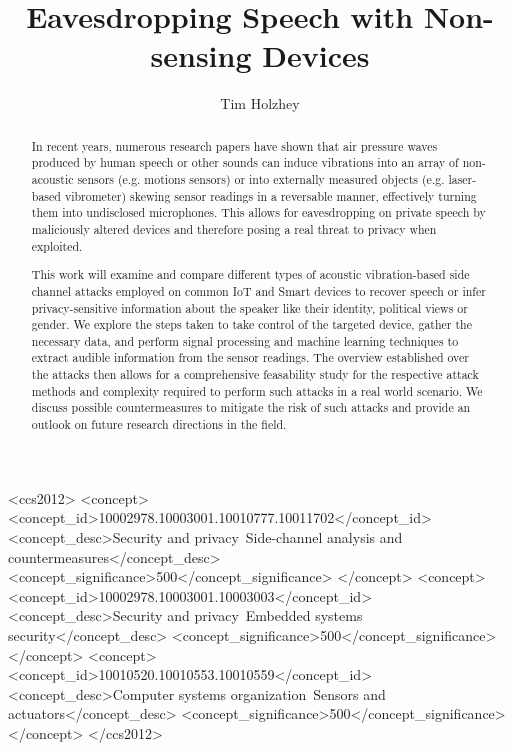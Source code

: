 \documentclass[sigconf, nonacm]{acmart}
\begin{document}
\title{Eavesdropping Speech with Non-sensing Devices}

\author{Tim Holzhey}

\begin{abstract}
  In recent years, numerous research papers have shown that air pressure waves produced by human speech or other sounds can induce vibrations into an array of non-acoustic sensors (e.g. motions sensors) or into externally measured objects (e.g. laser-based vibrometer) skewing sensor readings in a reversable manner, effectively turning them into undisclosed microphones.
  This allows for eavesdropping on private speech by maliciously altered devices and therefore posing a real threat to privacy when exploited.
  
  This work will examine and compare different types of acoustic vibration-based side channel attacks employed on common IoT and Smart devices to recover speech or infer privacy-sensitive information about the speaker like their identity, political views or gender.
  We explore the steps taken to take control of the targeted device, gather the necessary data, and perform signal processing and machine learning techniques to extract audible information from the sensor readings.
  The overview established over the attacks then allows for a comprehensive feasability study for the respective attack methods and complexity required to perform such attacks in a real world scenario. 
  We discuss possible countermeasures to mitigate the risk of such attacks and provide an outlook on future research directions in the field.
\end{abstract}

\begin{CCSXML}
  <ccs2012>
  <concept>
  <concept_id>10002978.10003001.10010777.10011702</concept_id>
  <concept_desc>Security and privacy~Side-channel analysis and countermeasures</concept_desc>
  <concept_significance>500</concept_significance>
  </concept>
  <concept>
  <concept_id>10002978.10003001.10003003</concept_id>
  <concept_desc>Security and privacy~Embedded systems security</concept_desc>
  <concept_significance>500</concept_significance>
  </concept>
  <concept>
  <concept_id>10010520.10010553.10010559</concept_id>
  <concept_desc>Computer systems organization~Sensors and actuators</concept_desc>
  <concept_significance>500</concept_significance>
  </concept>
  </ccs2012>
\end{CCSXML}
\end{document}
